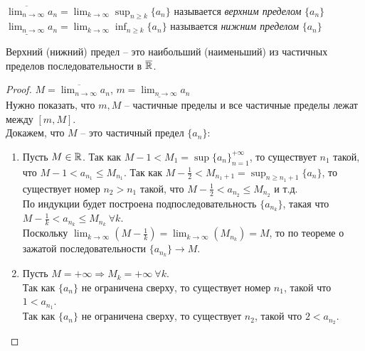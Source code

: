     \begin{definition} \ \\
        $\overline{\lim_{n \to \infty}} a_{n} = \lim_{k \to \infty} \sup_{n \geq k}\{a_{n}\}$ называется \textit{верхним пределом} $\{a_{n}\}$\\
        $\underline{\lim_{n \to \infty}} a_{n} = \lim_{k \to \infty} \inf_{n \geq k}\{a_{n}\}$ называется \textit{нижним пределом} $\{a_{n}\}$\\
    \end{definition}

    \begin{theorem}
        Верхний (нижний) предел -- это наибольший (наименьший) из частичных пределов последовательности в $\overline{\mathbb{R}}$.
    \end{theorem}

    \begin{proof}
        $M = \overline{\lim_{n \to \infty}} a_{n}$, $m = \underline{\lim_{n \to \infty}} a_{n}$\\
        Нужно показать, что $m, M$ -- частичные пределы и все частичные пределы лежат между $[m, M]$.\\
        Докажем, что $M$ -- это частичный предел $\{a_{n}\}$:
        \begin{enumerate}
            \item 
            Пусть $M \in \mathbb{R}$. Так как $M-1 < M_1 = \sup\{a_{n}\}_{n = 1}^{+\infty}$, то существует $n_1$ такой, что $M-1 < a_{n_1} \leq M_{n_{1}}$. Так как $M - \frac{1}{2} < M_{n_1 + 1} = \sup_{n \geq n_1+1}\{a_{n}\}$, то существует номер $n_2 > n_1$ такой, что $M - \frac{1}{2} < a_{n_2} \leq M_{n_2}$ и т.д.\\
            По индукции будет построена подпоследовательность $\{a_{n_{k}}\}$, такая что\\
            $M-\frac{1}{k} < a_{n_{k}} \leq M_{n_{k}} \ \forall k$.\\
            Поскольку $\lim_{k \to \infty} (M - \frac{1}{k}) = \lim_{k \to \infty} (M_{n_{k}}) = M$, то по теореме о зажатой последовательности $\{a_{n_{k}}\} \to M$.
            \item 
            Пусть $M = +\infty \Rightarrow M_{k} = +\infty \ \forall k$.\\
            Так как $\{a_{n}\}$ не ограничена сверху, то существует номер $n_1$, такой что $1 < a_{n_1}$.\\
            Так как $\{a_{n}\}$ не ограничена сверху, то существует $n_2$, такой что $2 < a_{n_2}$.\\

\end{enumerate}
\end{proof}
